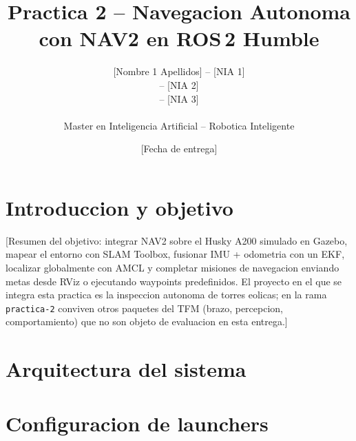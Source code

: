 \documentclass[11pt,a4paper]{article}
\title{Practica 2 -- Navegacion Autonoma con NAV2 en ROS\,2 Humble}
\author{
  [Nombre 1 Apellidos] -- [NIA 1] \\
  [Nombre 2 Apellidos] -- [NIA 2] \\
  [Nombre 3 Apellidos] -- [NIA 3] \\
  \\
  Master en Inteligencia Artificial -- Robotica Inteligente
}
\date{[Fecha de entrega]}
\begin{document}
\maketitle
\thispagestyle{empty}

\section{Introduccion y objetivo}
\label{sec:intro}

[Resumen del objetivo: integrar NAV2 sobre el Husky A200 simulado en Gazebo,
mapear el entorno con SLAM Toolbox, fusionar IMU + odometria con un EKF,
localizar globalmente con AMCL y completar misiones de navegacion enviando
metas desde RViz o ejecutando waypoints predefinidos. El proyecto en el que se
integra esta practica es la inspeccion autonoma de torres eolicas; en la rama
\texttt{practica-2} conviven otros paquetes del TFM (brazo, percepcion,
comportamiento) que no son objeto de evaluacion en esta entrega.]

\section{Arquitectura del sistema}
\label{sec:arquitectura}



\section{Configuracion de launchers}
\label{sec:launchers}

\end{document}
